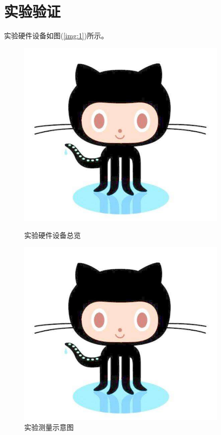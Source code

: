 \documentclass[winfonts,bachelor,oneside,nobackinfo]{njuthesis}
\begin{document}
\chapter{实验验证}
\lipsum[2]

实验硬件设备如图(\ref{img:1})所示。
\begin{figure}[htbp]
\begin{minipage}[t]{0.5\textwidth}
\centering
\includegraphics[width=0.9\textwidth]{./figure/github.jpg}
\caption{实验硬件设备总览}
\label{img:1}
\end{minipage}
\begin{minipage}[t]{0.5\textwidth}
\centering
\includegraphics[width=0.9\textwidth]{./figure/github.jpg}
\caption{实验测量示意图}
\label{img:2}
\end{minipage}
\end{figure}
\end{document}
